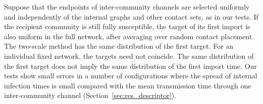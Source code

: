 \begin{remark}
\label{rem:placement}
Suppose that the endpoints of inter-community channels are selected uniformly and independently of the internal graphs and other contact sets, as in our tests. If the recipient community is still fully susceptible, the target of its first import is also uniform in the full network, after averaging over random contact placement. The two-scale method has the same distribution of the first target. For an individual fixed network, the targets need not coincide. The same distribution of the first target does not imply the same distribution of the first import time. Our tests show small errors in a number of configurations where the spread of internal infection times is small compared with the mean transmission time through one inter-community channel (Section~\ref{sec:res_descriptor}).
\end{remark}
